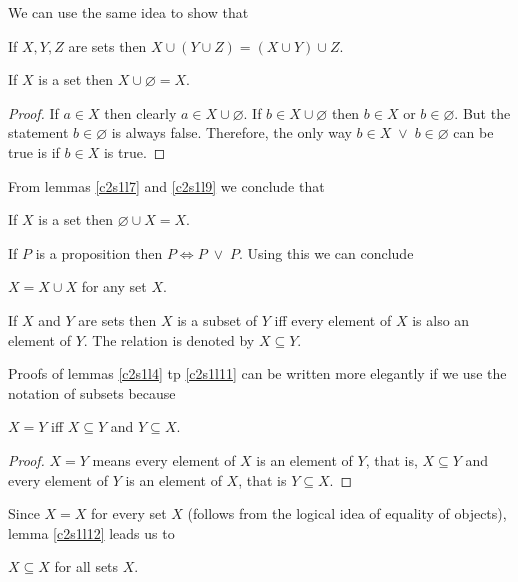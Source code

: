 We can use the same idea to show that
\begin{lem}\label{c2s1l8}
If $X, Y, Z$ are sets then $X \cup (Y \cup Z) = (X \cup Y) \cup Z$.
\end{lem}

\begin{lem}\label{c2s1l9}
If $X$ is a set then $X \cup \varnothing = X$.
\end{lem}
\begin{proof}
If $a \in X$ then clearly $a \in X \cup \varnothing$. If $b \in X \cup
\varnothing$ then $b \in X$ or $b \in \varnothing$. But the statement $b 
\in \varnothing$ is always false. Therefore, the only way $b \in X 
\;\lor\; b \in \varnothing$ can be true is if $b \in X$ is true.
\end{proof}

From lemmas \ref{c2s1l7} and \ref{c2s1l9} we conclude that
\begin{lem}\label{c2s1l10}
If $X$ is a set then $\varnothing \cup X = X$.
\end{lem}

If $P$ is a proposition then $P \Leftrightarrow P \;\lor\; P$. Using this
we can conclude 
\begin{lem}\label{c2s1l11}
$X = X \cup X$ for any set $X$.
\end{lem}

\begin{defn}\label{c2s1d1}
If $X$ and $Y$ are sets then $X$ is a subset of $Y$ iff every element of 
$X$ is also an element of $Y$. The relation is denoted by $X \subseteq Y$.
\end{defn}

Proofs of lemmas \ref{c2s1l4} tp \ref{c2s1l11} can be written more 
elegantly if we use the notation of subsets because
\begin{lem}\label{c2s1l12}
$X = Y$ iff $X \subseteq Y$ and $Y \subseteq X$.
\end{lem}
\begin{proof}
$X = Y$ means every element of $X$ is an element of $Y$, that is, $X 
\subseteq Y$ and every element of $Y$ is an element of $X$, that is $Y 
\subseteq X$.
\end{proof}

Since $X = X$ for every set $X$ (follows from the logical idea of equality
of objects), lemma \ref{c2s1l12} leads us to
\begin{lem}\label{c2s2l13}
$X \subseteq X$ for all sets $X$.
\end{lem}

